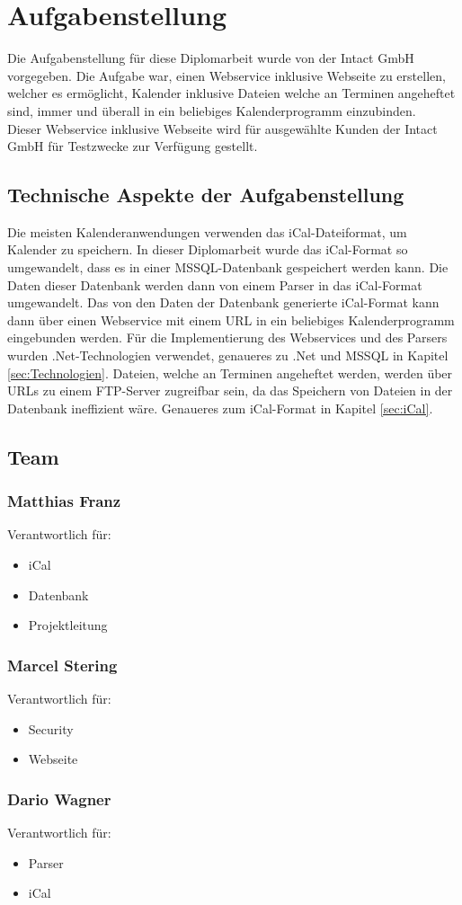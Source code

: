 \chapter{Aufgabenstellung}
\label{sec:Aufgabenstellung}
Die Aufgabenstellung für diese Diplomarbeit wurde von der Intact GmbH vorgegeben. Die Aufgabe war, einen Webservice inklusive Webseite zu erstellen, welcher es ermöglicht, Kalender inklusive Dateien welche an Terminen angeheftet sind, immer und überall in ein beliebiges Kalenderprogramm einzubinden. \\
Dieser Webservice inklusive Webseite wird für ausgewählte Kunden der Intact GmbH für Testzwecke zur Verfügung gestellt. \\

\section{Technische Aspekte der Aufgabenstellung}
\label{sec:TechnischeAspekteDerAufgabenstellung}
Die meisten Kalenderanwendungen verwenden das iCal-Dateiformat, um Kalender zu speichern. In dieser Diplomarbeit wurde das iCal-Format so umgewandelt, dass es in einer MSSQL-Datenbank gespeichert werden kann. Die Daten dieser Datenbank werden dann von einem Parser in das iCal-Format umgewandelt. Das von den Daten der Datenbank generierte iCal-Format kann dann über einen Webservice mit einem URL in ein beliebiges Kalenderprogramm eingebunden werden. Für die Implementierung des Webservices und des Parsers wurden .Net-Technologien verwendet, genaueres zu .Net und MSSQL in Kapitel \ref{sec:Technologien}.  Dateien, welche an Terminen angeheftet werden, werden über URLs zu einem FTP-Server zugreifbar sein, da das Speichern von Dateien in der Datenbank ineffizient wäre. Genaueres zum iCal-Format in Kapitel \ref{sec:iCal}.
\pagebreak

\section{Team}
\label{sec:Team}
	\subsection*{Matthias Franz}
		Verantwortlich für: 
		\begin{itemize}
			\item iCal
			\item Datenbank
			\item Projektleitung
		\end{itemize}
			\subsection*{Marcel Stering}
		Verantwortlich für: 
		\begin{itemize}
			\item Security
			\item Webseite
		\end{itemize}
	\subsection*{Dario Wagner}
		Verantwortlich für: 
		\begin{itemize}
			\item Parser
			\item iCal
		\end{itemize}
	
\pagebreak			